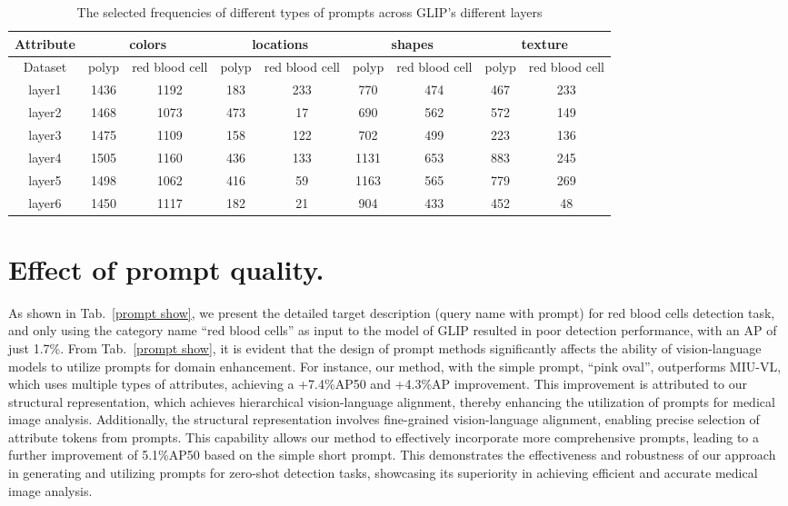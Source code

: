 \begin{table}[ht]
    \centering
    \setlength{\tabcolsep}{1.8pt}
    \begin{tabular}{c|cc|cc|cc|cc}\toprule
         Attribute&  \multicolumn{2}{c|}{colors}&  \multicolumn{2}{c|}{locations}&  \multicolumn{2}{c|}{shapes}&  \multicolumn{2}{c}{texture}\\
 \midrule
 Dataset& polyp& red blood cell& polyp& red blood cell& polyp& red blood cell& polyp& red blood cell\\
 \midrule
         layer1&  1436&  1192
&  183
&  233
&  770
&  474
&  467
&  233
\\
         layer2&  1468&  1073
&  473
&  17
&  690
&  562
&  572
&  149
\\
         layer3&  1475&  1109
&  158
&  122
&  702
&  499
&  223
&  136
\\
         layer4&  1505&  1160
&  436
&  133
&  1131
&  653
&  883
&  245
\\
         layer5&  1498&  1062
&  416
&  59
&  1163
&  565
&  779
&  269
\\
         layer6&  1450&  1117&  182
&  21&  904
&  433&  452
&  48\\
\midrule
    \end{tabular}
    \caption{The selected frequencies of different types of prompts across GLIP's different layers}
    \label{tab:frequence selected in validation}
\end{table}



\section{Effect of prompt quality.}

As shown in Tab.~\ref{prompt show}, we present the detailed target description (query name with prompt) for red blood cells detection task, and only using the category name ``red blood cells'' as input to the model of GLIP resulted in poor detection performance, with an AP of just 1.7\%. 
From Tab.~\ref{prompt show}, it is evident that the design of prompt methods significantly affects the ability of vision-language models to utilize prompts for domain enhancement. For instance, our method, with the simple prompt, ``pink oval'', outperforms MIU-VL, which uses multiple types of attributes, achieving a +7.4\%AP50 and +4.3\%AP improvement. This improvement is attributed to our structural representation, which achieves hierarchical vision-language alignment, thereby enhancing the utilization of prompts for medical image analysis. 
Additionally, the structural representation involves fine-grained vision-language alignment, enabling precise selection of attribute tokens from prompts. This capability allows our method to effectively incorporate more comprehensive prompts, leading to a further improvement of 5.1\%AP50 based on the simple short prompt. This demonstrates the effectiveness and robustness of our approach in generating and utilizing prompts for zero-shot detection tasks, showcasing its superiority in achieving efficient and accurate medical image analysis.




